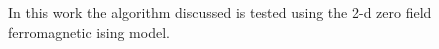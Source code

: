 \documentclass[twocolumn]{article}
\begin{document}
In this work the algorithm discussed is tested using the 2-d zero field ferromagnetic ising model. 
\end{document}
